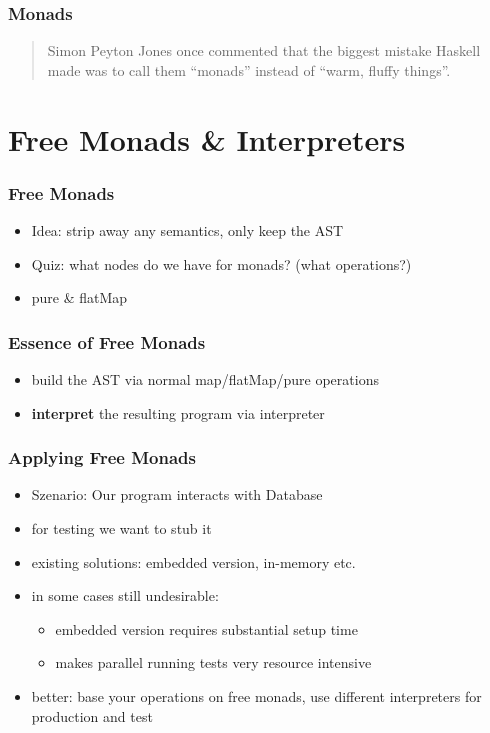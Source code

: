 \documentclass{beamer}
\begin{document}
\begin{frame}
  \frametitle{Monads}
  \begin{quote}
    Simon Peyton Jones once commented that the biggest mistake
    Haskell made was to call them ``monads'' instead of ``warm, fluffy
    things''.
  \end{quote}
\end{frame}

\section{Free Monads \& Interpreters}

\begin{frame}
  \frametitle{Free Monads}
  \begin{itemize}
  \item<1> Idea: strip away any semantics, only keep the AST
  \item<1> Quiz: what nodes do we have for monads? (what operations?)
  \item<2> pure \& flatMap
  \end{itemize}
\end{frame}

\begin{frame}
  \frametitle{Essence of Free Monads}
  \begin{itemize}
  \item build the AST via normal map/flatMap/pure operations
  \item \textbf{interpret} the resulting program via interpreter
  \end{itemize}
\end{frame}

\begin{frame}
  \frametitle{Applying Free Monads}
  \begin{itemize}
  \item Szenario: Our program interacts with Database
  \item<1> for testing we want to stub it
  \item<1> existing solutions: embedded version, in-memory etc.
  \item<2> in some cases still undesirable:
    \begin{itemize}
    \item embedded version requires substantial setup time
    \item makes parallel running tests very resource intensive
    \end{itemize}
  \item<2> better: base your operations on free monads, use different
    interpreters for production and test
  \end{itemize}
\end{frame}
\end{document}
